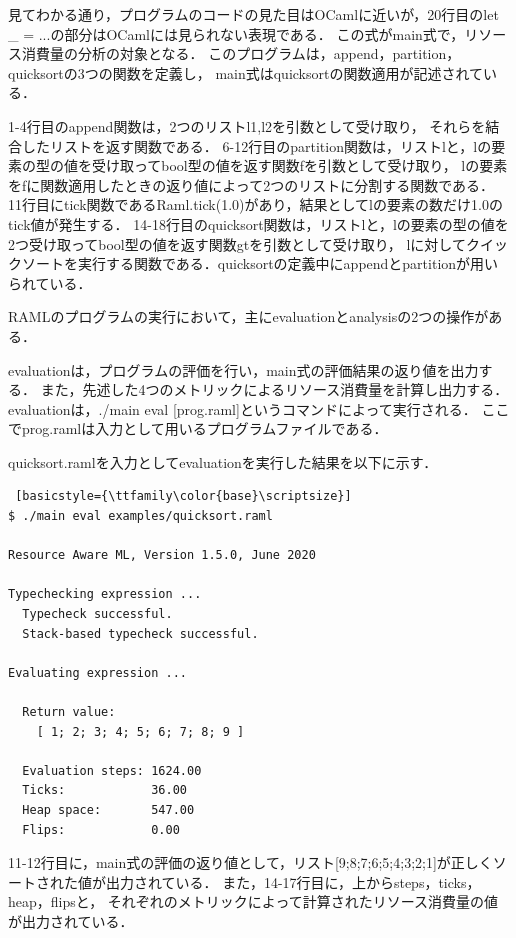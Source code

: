 \documentclass{kuisthesis}
\begin{document}
見てわかる通り，プログラムのコードの見た目はOCamlに近いが，20行目のlet \_ = ...の部分はOCamlには見られない表現である．
この式がmain式で，リソース消費量の分析の対象となる．
このプログラムは，append，partition，quicksortの3つの関数を定義し，
main式はquicksortの関数適用が記述されている．

1-4行目のappend関数は，2つのリストl1,l2を引数として受け取り，
それらを結合したリストを返す関数である．
6-12行目のpartition関数は，リストlと，lの要素の型の値を受け取ってbool型の値を返す関数fを引数として受け取り，
lの要素をfに関数適用したときの返り値によって2つのリストに分割する関数である．
11行目にtick関数であるRaml.tick(1.0)があり，結果としてlの要素の数だけ1.0のtick値が発生する．
14-18行目のquicksort関数は，リストlと，lの要素の型の値を2つ受け取ってbool型の値を返す関数gtを引数として受け取り，
lに対してクイックソートを実行する関数である．quicksortの定義中にappendとpartitionが用いられている．

RAMLのプログラムの実行において，主にevaluationとanalysisの2つの操作がある．

evaluationは，プログラムの評価を行い，main式の評価結果の返り値を出力する．
また，先述した4つのメトリックによるリソース消費量を計算し出力する．
evaluationは，./main eval [prog.raml]というコマンドによって実行される．
ここでprog.ramlは入力として用いるプログラムファイルである．

quicksort.ramlを入力としてevaluationを実行した結果を以下に示す．
\\

\begin{lstlisting} [basicstyle={\ttfamily\color{base}\scriptsize}]
$ ./main eval examples/quicksort.raml

Resource Aware ML, Version 1.5.0, June 2020

Typechecking expression ...
  Typecheck successful.
  Stack-based typecheck successful.

Evaluating expression ...

  Return value:
    [ 1; 2; 3; 4; 5; 6; 7; 8; 9 ]

  Evaluation steps: 1624.00
  Ticks:            36.00
  Heap space:       547.00
  Flips:            0.00

\end{lstlisting}

11-12行目に，main式の評価の返り値として，リスト[9;8;7;6;5;4;3;2;1]が正しくソートされた値が出力されている．
また，14-17行目に，上からsteps，ticks，heap，flipsと，
それぞれのメトリックによって計算されたリソース消費量の値が出力されている．
\end{document}
